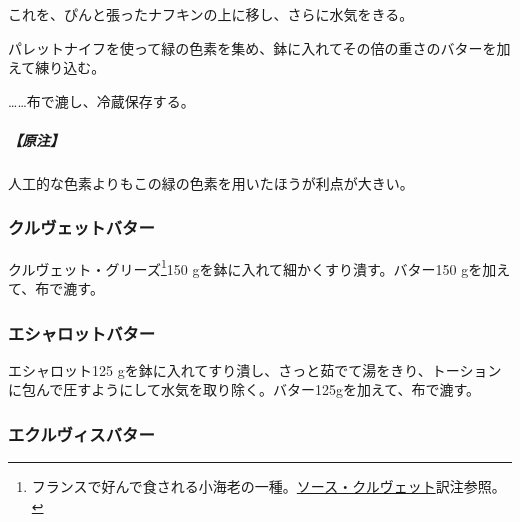 \begin{recette}
これを、ぴんと張ったナフキンの上に移し、さらに水気をきる。

パレットナイフを使って緑の色素を集め、鉢に入れてその倍の重さのバターを加えて練り込む。

\ldots{}\ldots{}布で漉し、冷蔵保存する。

\hypertarget{nota-beurre-colorant-vert}{%
\subparagraph{【原注】}\label{nota-beurre-colorant-vert}}

人工的な色素よりもこの緑の色素を用いたほうが利点が大きい。

\hypertarget{beurre-de-crevettes}{%
\subsubsection{クルヴェットバター}\label{beurre-de-crevettes}}



クルヴェット・グリーズ\footnote{フランスで好んで食される小海老の一種。\protect\hyperlink{sauce-aux-crevettes}{ソース・クルヴェット}訳注参照。}150
gを鉢に入れて細かくすり潰す。バター150 gを加えて、布で漉す。

\hypertarget{beurre-d-echalote}{%
\subsubsection{エシャロットバター}\label{beurre-d-echalote}}



エシャロット125
gを鉢に入れてすり潰し、さっと茹でて湯をきり、トーションに包んで圧すようにして水気を取り除く。バター125gを加えて、布で漉す。

\hypertarget{beurre-d-ecrevisse}{%
\subsubsection{エクルヴィスバター}\label{beurre-d-ecrevisse}}




\end{recette}
